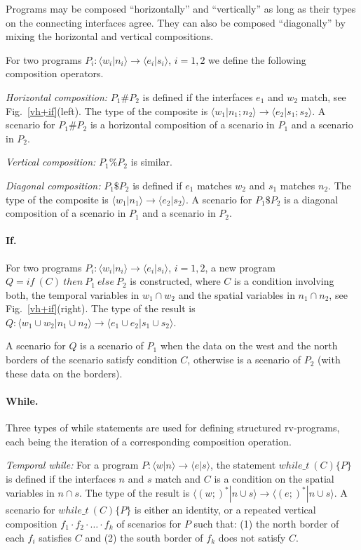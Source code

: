 \documentclass[runningheads]{llncs}
\newcommand{\1}{\u{a}}
\newcommand{\2}{\c{s}}
\newcommand{\5}{\c{t}}
\newcommand{\8}{\^{\i}}
\newcommand{\9}{\^{a}}
\newcommand{\comp}{\cdot}
\newcommand{\ra}{\rightarrow}
\newcommand{\vcomp}{\comp}
\newcommand{\pvcomp}{\%}\newcommand{\phcomp}{\#}\newcommand{\pdcomp}{\$}
\newcommand{\tsrv}[4]{\langle #1|#2\rangle\ra\langle #3|#4\rangle}
\begin{document}
Programs may be composed ``horizontally'' and ``vertically'' as long as their types on the connecting
interfaces agree. They can also be composed ``diagonally'' by mixing the horizontal and vertical compositions.

For two programs $P_i:\tsrv{w_i}{n_i}{e_i}{s_i}$, $i=1,2$ we define the following composition operators.

{\em Horizontal composition:} $P_1\phcomp P_2$ is defined if the interfaces $e_1$ and $w_2$ match, see
Fig.~\ref{vh+if}(left). The type of the composite is $\tsrv{w_1}{n_1;n_2}{e_2}{s_1;s_2}$. A scenario for
$P_1\phcomp P_2$ is a horizontal composition of a scenario in $P_1$ and a scenario in $P_2$.

{\em Vertical composition:} $P_1\pvcomp P_2$ is similar.

{\em Diagonal composition:} $P_1\pdcomp P_2$ is defined if $e_1$ matches $w_2$ and $s_1$ matches $n_2$. The
type of the composite is $\tsrv{w_1}{n_1}{e_2}{s_2}$. A scenario for $P_1\pdcomp P_2$ is a diagonal
composition of a scenario in $P_1$ and a scenario in $P_2$.

\paragraph{If.}

For two programs $P_i:\tsrv{w_i}{n_i}{e_i}{s_i}$, $i=1,2$, a new program $Q=if\ (C)\ then\ P_1\ else\ P_2$ is
constructed, where $C$ is a condition involving both, the temporal variables in $w_1\cap w_2$ and the spatial
variables in $n_1\cap n_2$, see Fig.~\ref{vh+if}(right). The type of the result is $Q:\tsrv{w_1\cup
  w_2}{n_1\cup n_2}{e_1\cup e_2}{s_1\cup s_2}$.

A scenario for $Q$ is a scenario of $P_1$ when the data on the west and the north borders of the scenario
satisfy condition $C$, otherwise is a scenario of $P_2$ (with these data on the borders).

\paragraph{While.} 

Three types of while statements are used for defining structured rv-programs, each being the iteration of a
corresponding composition operation.

{\em Temporal while:} For a program $P:\tsrv{w}{n}{e}{s}$, the statement $while\_t\ (C)\{P\}$ is defined if
the interfaces $n$ and $s$ match and $C$ is a condition on the spatial variables in $n\cap s$. The type of the
result is $\tsrv{(w;)^*}{n\cup s}{(e;)^*}{n\cup s}$. A scenario for $while\_t\ (C)\{P\}$ is either an
identity, or a repeated vertical composition $f_1\vcomp f_2\vcomp\dots\vcomp f_k$ of scenarios for $P$ such
that: (1) the north border of each $f_i$ satisfies $C$ and (2) the south border of $f_k$ does not satisfy $C$.
\end{document}
